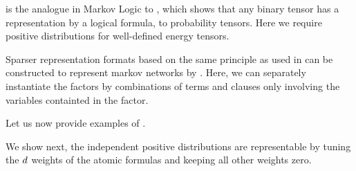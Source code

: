 
 is the analogue in Markov Logic to , which shows that any binary tensor has a representation by a logical formula, to probability tensors.
Here we require positive distributions for well-defined energy tensors.

Sparser representation formats based on the same principle as used in  can be constructed to represent markov networks by \MarkovLogicNetworks{}.
Here, we can separately instantiate the factors by combinations of terms and clauses only involving the variables containted in the factor.


Let us now provide examples of \MarkovLogicNetworks{}.


We show next, the independent positive distributions are representable by tuning the $d$ weights of the atomic formulas and keeping all other weights zero.

